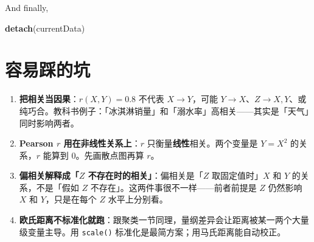 \documentclass[
]{ctexart}
\newenvironment{Shaded}{\begin{snugshade}}{\end{snugshade}}
\newcommand{\FunctionTok}[1]{\textcolor[rgb]{0.13,0.29,0.53}{\textbf{#1}}}
\newcommand{\NormalTok}[1]{#1}
\begin{document}
And finally,

\begin{Shaded}
\begin{Highlighting}[]
\FunctionTok{detach}\NormalTok{(currentData)}
\end{Highlighting}
\end{Shaded}

\hypertarget{ux5bb9ux6613ux8e29ux7684ux5751}{%
\section{容易踩的坑}\label{ux5bb9ux6613ux8e29ux7684ux5751}}

\begin{pitfall}[相关与距离的常见误区]
\begin{enumerate}
\item \textbf{把相关当因果}：$r(X, Y) = 0.8$ 不代表 $X \to Y$，可能 $Y \to X$、$Z \to X, Y$、或纯巧合。教科书例子：「冰淇淋销量」和「溺水率」高相关——其实是「天气」同时影响两者。
\item \textbf{Pearson $r$ 用在非线性关系上}：$r$ 只衡量\textbf{线性}相关。两个变量是 $Y = X^2$ 的关系，$r$ 能算到 0。先画散点图再算 $r$。
\item \textbf{偏相关解释成「$Z$ 不存在时的相关」}：偏相关是「$Z$ 取固定值时」$X$ 和 $Y$ 的关系，不是「假如 $Z$ 不存在」。这两件事很不一样——前者前提是 $Z$ 仍然影响 $X$ 和 $Y$，只是在每个 $Z$ 水平上分别看。
\item \textbf{欧氏距离不标准化就跑}：跟聚类一节同理，量纲差异会让距离被某一两个大量级变量主导。用 \texttt{scale()} 标准化是最简方案；用马氏距离能自动校正。
\end{enumerate}
\end{pitfall}
\end{document}
